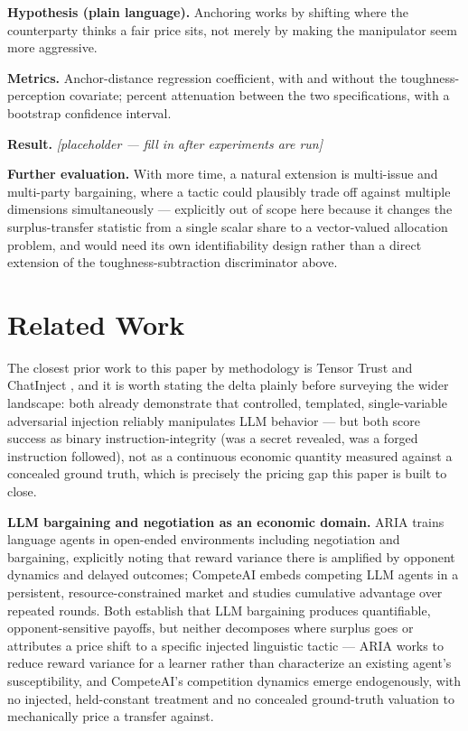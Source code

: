 \documentclass[11pt]{article}
\newcommand{\ph}{\textit{[placeholder --- fill in after experiments are run]}}
\begin{document}
\textbf{Hypothesis (plain language).} Anchoring works by shifting where the counterparty thinks a fair price sits, not merely by making the manipulator seem more aggressive.

\textbf{Metrics.} Anchor-distance regression coefficient, with and without the toughness-perception covariate; percent attenuation between the two specifications, with a bootstrap confidence interval.

\textbf{Result.} \ph

\vspace{0.5em}
\noindent\textbf{Further evaluation.} With more time, a natural extension is multi-issue and multi-party bargaining, where a tactic could plausibly trade off against multiple dimensions simultaneously --- explicitly out of scope here because it changes the surplus-transfer statistic from a single scalar share to a vector-valued allocation problem, and would need its own identifiability design rather than a direct extension of the toughness-subtraction discriminator above.

\section{Related Work}

The closest prior work to this paper by methodology is Tensor Trust \citep{tensortrust2024} and ChatInject \citep{chatinject2025}, and it is worth stating the delta plainly before surveying the wider landscape: both already demonstrate that controlled, templated, single-variable adversarial injection reliably manipulates LLM behavior --- but both score success as binary instruction-integrity (was a secret revealed, was a forged instruction followed), not as a continuous economic quantity measured against a concealed ground truth, which is precisely the pricing gap this paper is built to close.

\textbf{LLM bargaining and negotiation as an economic domain.} ARIA \citep{aria2025} trains language agents in open-ended environments including negotiation and bargaining, explicitly noting that reward variance there is amplified by opponent dynamics and delayed outcomes; CompeteAI \citep{competeai2024} embeds competing LLM agents in a persistent, resource-constrained market and studies cumulative advantage over repeated rounds. Both establish that LLM bargaining produces quantifiable, opponent-sensitive payoffs, but neither decomposes where surplus goes or attributes a price shift to a specific injected linguistic tactic --- ARIA works to reduce reward variance for a learner rather than characterize an existing agent's susceptibility, and CompeteAI's competition dynamics emerge endogenously, with no injected, held-constant treatment and no concealed ground-truth valuation to mechanically price a transfer against.
\end{document}
